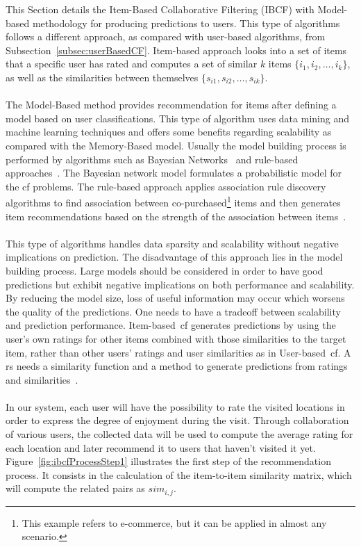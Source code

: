 This Section details the Item-Based Collaborative Filtering (IBCF) with Model-based methodology for producing predictions to users. This type of algorithms follows a different approach, as compared with user-based algorithms, from Subsection~\ref{subsec:userBasedCF}. Item-based approach looks into a set of items that a specific user has rated and computes a set of similar $k$ items $\{{i_{1}, i_{2}, \dots , i_{k}\}}$, as well as the similarities between themselves $\{{s_{i1}, s_{i2}, \dots , s_{ik}\}}$. \\
\\
The Model-Based method provides recommendation for items after defining a model based on user classifications. This type of algorithm uses data mining and machine learning techniques and offers some benefits regarding scalability as compared with the Memory-Based model. Usually the model building process is performed by algorithms such as Bayesian Networks~\cite{Bayesian} and rule-based approaches~\cite{ibCollabrativeVSGK}. The Bayesian network model formulates a probabilistic model for the \gls{cf} problems. The rule-based approach applies association rule discovery algorithms to find association between co-purchased\footnote{This example refers to e-commerce, but it can be applied in almost any scenario.} items and then generates item recommendations based on the strength of the association between items~\cite{ibCollabrativeVSGK}.\\
\\
This type of algorithms handles data sparsity and scalability without negative implications on prediction. The disadvantage of this approach lies in the model building process. Large models should be considered in order to have good predictions but exhibit negative implications on both performance and scalability. By reducing the model size, loss of useful information may occur which worsens the quality of the predictions. One needs to have a tradeoff between scalability and prediction performance. Item-based~\gls{cf} generates predictions by using the user's own ratings for other items combined with those similarities to the target item, rather than other users' ratings and user similarities as in User-based~\gls{cf}. A \gls{rs} needs a similarity function and a method to generate predictions from ratings and similarities~\cite{cfrsBook}.\\
\\
In our system, each user will have the possibility to rate the visited locations in order to express the degree of enjoyment during the visit. Through collaboration of various users, the collected data will be used to compute the average rating for each location and later recommend it to users that haven't visited it yet. Figure~\ref{fig:ibcfProcessStep1} illustrates the first step of the recommendation process. It consists in the calculation of the item-to-item similarity matrix, which will compute the related pairs as $sim_{i,j}$. 
